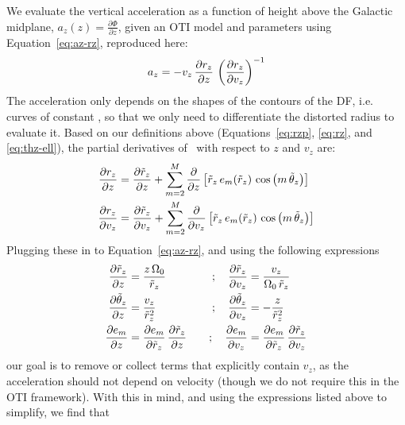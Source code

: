 We evaluate the vertical acceleration as a function of height above the Galactic
midplane, $a_z(z) = \frac{\partial \Phi}{\partial z}$, given an OTI model and parameters
using Equation~\ref{eq:az-rz}, reproduced here:
\begin{equation}
    a_z = - v_z \, \frac{\partial r_z}{\partial z} \,
        \left( \frac{\partial r_z}{\partial v_z} \right)^{-1}
\end{equation}
The acceleration only depends on the shapes of the contours of the DF, i.e. curves of
constant \rz, so that we only need to differentiate the distorted radius to evaluate it.
Based on our definitions above (Equations~\ref{eq:rzp}, \ref{eq:rz}, and
\ref{eq:thz-ell}), the partial derivatives of \rz\ with respect to $z$ and $v_z$ are:
\begin{align}
    \frac{\partial r_z}{\partial z} &=
        \frac{\partial \tilde{r}_z}{\partial z} +
        \sum_{m=2}^{M} \frac{\partial}{\partial z} \left[\tilde{r}_z \, e_m(\tilde{r}_z) \, \cos\left(m \, \tilde{\theta}_z\right)\right]\\
    \frac{\partial r_z}{\partial v_z} &=
        \frac{\partial \tilde{r}_z}{\partial v_z} +
        \sum_{m=2}^{M} \frac{\partial}{\partial v_z} \left[\tilde{r}_z \, e_m(\tilde{r}_z) \, \cos\left(m \, \tilde{\theta}_z\right)\right]
\end{align}
Plugging these in to Equation~\ref{eq:az-rz}, and using the following expressions
\begin{alignat}{3}
    \frac{\partial \tilde{r}_z}{\partial z} &= \frac{z\,\Omega_0}{\tilde{r}_z} \quad &; \quad
        \frac{\partial \tilde{r}_z}{\partial v_z} &= \frac{v_z}{\Omega_0 \, \tilde{r}_z} \\
    \frac{\partial \tilde{\theta}_z}{\partial z} &= \frac{v_z}{\tilde{r}_z^2} \quad &; \quad
        \frac{\partial \tilde{\theta}_z}{\partial v_z} &= -\frac{z}{\tilde{r}_z^2} \\
    \frac{\partial e_m}{\partial z} &=
        \frac{\partial e_m}{\partial \tilde{r}_z} \, \frac{\partial \tilde{r}_z}{\partial z}
        \quad &; \quad
        \frac{\partial e_m}{\partial v_z} &=
        \frac{\partial e_m}{\partial \tilde{r}_z} \, \frac{\partial \tilde{r}_z}{\partial v_z}
\end{alignat}
our goal is to remove or collect terms that explicitly contain $v_z$, as the
acceleration should not depend on velocity (though we do not require this in the OTI
framework).
With this in mind, and using the expressions listed above to simplify, we find that
